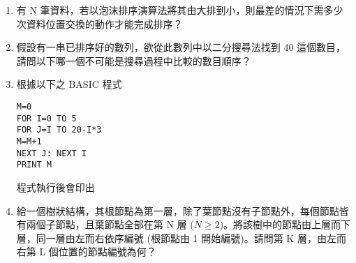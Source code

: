 \documentclass[12pt,a4paper]{report}
\begin{document}
\begin{CJK}{UTF8}{bkai}
\begin{enumerate}
\item 有 N 筆資料，若以泡沫排序演算法將其由大排到小，則最差的情況下需多少次資料位置交換的動作才能完成排序？
\item 假設有一串已排序好的數列，欲從此數列中以二分搜尋法找到 40 這個數目，請問以下哪一個不可能是搜尋過程中比較的數目順序？
\item 根據以下之 BASIC 程式
  \begin{lstlisting}[language={[Visual]Basic}]
M=0
FOR I=0 TO 5
FOR J=I TO 20-I*3
M=M+1
NEXT J: NEXT I
PRINT M
  \end{lstlisting}
  程式執行後會印出
\item \label{ntpc-92-p42} 給一個樹狀結構，其根節點為第一層，除了葉節點沒有子節點外，每個節點皆有兩個子節點，且葉節點全部在第 N 層 ($N\geq{2}$)。將該樹中的節點由上層而下層，同一層由左而右依序編號 (根節點由 1 開始編號)。請問第 K 層，由左而右第 L 個位置的節點編號為何？
\end{enumerate}
\end{CJK}
\end{document}

